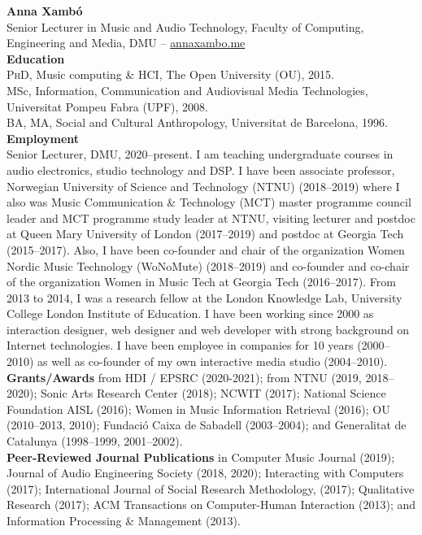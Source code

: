 \documentclass[10pt, a4paper]{article}
\begin{document}

{\textbf{Anna Xambó}}\\ 
Senior Lecturer in Music and Audio Technology, Faculty of Computing, Engineering and Media, DMU -- \href{http://annaxambo.me/}{annaxambo.me}\\

{\textbf{Education}}\\
\textsc{PhD}, Music computing \& HCI, The Open University (OU), 2015.\\
MSc, Information, Communication and Audiovisual Media Technologies, Universitat Pompeu Fabra (UPF), 2008.\\
BA, MA, Social and Cultural Anthropology, Universitat de Barcelona, 1996.\\

{\textbf{Employment}}\\
Senior Lecturer, DMU, 2020--present. I am teaching undergraduate courses in audio electronics, studio technology and DSP. 
I have been associate professor, Norwegian University of Science and Technology (NTNU) (2018--2019) where I also was Music Communication \& Technology (MCT) master programme council leader and MCT programme study leader at NTNU, visiting lecturer and postdoc at Queen Mary University of London (2017--2019) and postdoc at Georgia Tech (2015--2017). Also, I have been co-founder and chair of the organization Women Nordic Music Technology (WoNoMute) (2018--2019) and co-founder and co-chair of the organization Women in Music Tech at Georgia Tech (2016--2017). From 2013 to 2014, I was a research fellow at the London Knowledge Lab, University College London Institute of Education.
I have been working since 2000 as interaction designer, web designer and web developer with strong background on Internet technologies. I have been employee in companies for 10 years (2000--2010) as well as co-founder of my own interactive media studio (2004--2010).\\

{\textbf{Grants/Awards}} from HDI / EPSRC (2020-2021); from NTNU (2019, 2018--2020); Sonic Arts Research Center (2018); NCWIT (2017); National Science Foundation AISL (2016); Women in Music Information Retrieval (2016); OU (2010--2013, 2010); Fundació Caixa de Sabadell (2003--2004); and Generalitat de Catalunya (1998--1999, 2001--2002).\\

{\textbf{Peer-Reviewed Journal Publications}} in Computer Music Journal (2019); Journal of Audio Engineering Society (2018, 2020); Interacting with Computers (2017); International Journal of Social Research Methodology, (2017); Qualitative Research (2017); ACM Transactions on Computer-Human Interaction (2013); and Information Processing \& Management (2013).\\
\end{document}

